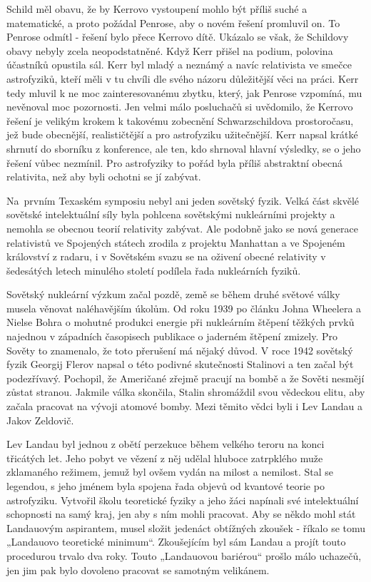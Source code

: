   Schild měl obavu, že by Kerrovo vystoupení mohlo být příliš suché a matematické, a proto požádal
  Penrose, aby o novém řešení promluvil on. To Penrose odmítl - řešení bylo přece Kerrovo dítě.
  Ukázalo se však, že Schildovy obavy nebyly zcela neopodstatněné. Když Kerr přišel na podium,
  polovina účastníků opustila sál. Kerr byl mladý a neznámý a navíc relativista ve smečce
  astrofyziků, kteří měli v tu chvíli dle svého názoru důležitější věci na práci. Kerr tedy mluvil k
  ne moc zainteresovanému zbytku, který, jak Penrose vzpomíná, mu nevěnoval moc pozornosti. Jen
  velmi málo posluchačů si uvědomilo, že Kerrovo řešení je velikým krokem k takovému zobecnění
  Schwarzschildova prostoročasu, jež bude obecnější, realističtější a pro astrofyziku užitečnější.
  Kerr napsal krátké shrnutí do sborníku z konference, ale ten, kdo shrnoval hlavní výsledky, se o
  jeho řešení vůbec nezmínil. Pro astrofyziky to pořád byla příliš abstraktní obecná relativita, než
  aby byli ochotni se jí zabývat. 

  Na prvním Texaském symposiu nebyl ani jeden sovětský fyzik. Velká část skvělé sovětské
  intelektuální síly byla pohlcena sovětskými nukleárními projekty a nemohla se obecnou teorií
  relativity zabývat. Ale podobně jako se nová generace relativistů ve Spojených státech zrodila z
  projektu Manhattan a ve Spojeném království z radaru, i v Sovětském svazu se na oživení obecné
  relativity v šedesátých letech minulého století podílela řada nukleárních fyziků. 

  Sovětský nukleární výzkum začal pozdě, země se během druhé světové války musela věnovat
  naléhavějším úkolům. Od roku 1939 po článku Johna Wheelera a Nielse Bohra o mohutné produkci
  energie při nukleárním štěpení těžkých prvků najednou v západních časopisech publikace o jaderném
  štěpení zmizely. Pro Sověty to znamenalo, že toto přerušení má nějaký důvod. V roce 1942 sovětský
  fyzik Georgij Flerov napsal o této podivné skutečnosti Stalinovi a ten začal být podezřívavý.
  Pochopil, že Američané zřejmě pracují na bombě a že Sověti nesmějí zůstat stranou. Jakmile válka
  skončila, Stalin shromáždil svou vědeckou elitu, aby začala pracovat na vývoji atomové bomby. Mezi
  těmito vědci byli i Lev Landau a Jakov Zeldovič. 

  Lev Landau byl jednou z obětí perzekuce během velkého teroru na konci třicátých let. Jeho pobyt ve
  vězení z něj udělal hluboce zatrpklého muže zklamaného režimem, jemuž byl ovšem vydán na milost a
  nemilost. Stal se legendou, s jeho jménem byla spojena řada objevů od kvantové teorie po
  astrofyziku. Vytvořil školu teoretické fyziky a jeho žáci napínali své intelektuální schopnosti na
  samý kraj, jen aby s ním mohli pracovat. Aby se někdo mohl stát Landauovým aspirantem, musel
  složit jedenáct obtížných zkoušek - říkalo se tomu „Landauovo teoretické minimum“. Zkoušejícím byl
  sám Landau a projít touto procedurou trvalo dva roky. Touto „Landauovou bariérou“ prošlo málo
  uchazečů, jen jim pak bylo dovoleno pracovat se samotným velikánem. 

